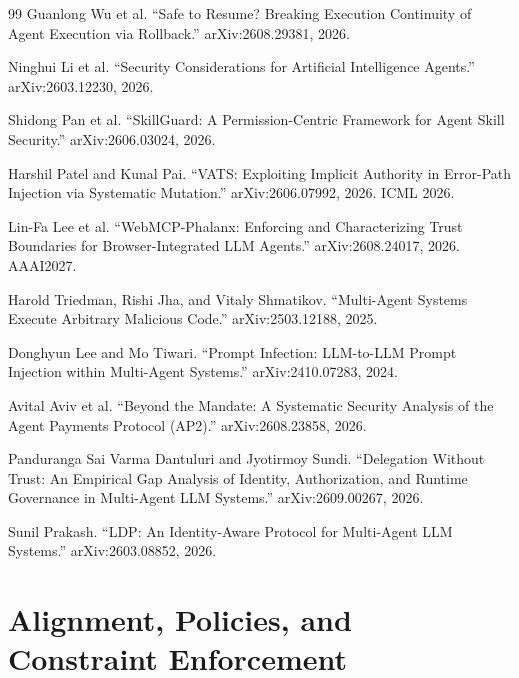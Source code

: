 \documentclass[11pt]{book}
\begin{document}
\begin{thebibliography}{99}
Guanlong Wu et al.
``Safe to Resume? Breaking Execution Continuity of Agent Execution via Rollback.''
arXiv:2608.29381, 2026.

Ninghui Li et al.
``Security Considerations for Artificial Intelligence Agents.''
arXiv:2603.12230, 2026.

Shidong Pan et al.
``SkillGuard: A Permission-Centric Framework for Agent Skill Security.''
arXiv:2606.03024, 2026.

Harshil Patel and Kunal Pai.
``VATS: Exploiting Implicit Authority in Error-Path Injection via Systematic Mutation.''
arXiv:2606.07992, 2026. ICML 2026.

Lin-Fa Lee et al.
``WebMCP-Phalanx: Enforcing and Characterizing Trust Boundaries for Browser-Integrated LLM Agents.''
arXiv:2608.24017, 2026. AAAI2027.

Harold Triedman, Rishi Jha, and Vitaly Shmatikov.
``Multi-Agent Systems Execute Arbitrary Malicious Code.''
arXiv:2503.12188, 2025.

Donghyun Lee and Mo Tiwari.
``Prompt Infection: LLM-to-LLM Prompt Injection within Multi-Agent Systems.''
arXiv:2410.07283, 2024.

Avital Aviv et al.
``Beyond the Mandate: A Systematic Security Analysis of the Agent Payments Protocol (AP2).''
arXiv:2608.23858, 2026.

Panduranga Sai Varma Dantuluri and Jyotirmoy Sundi.
``Delegation Without Trust: An Empirical Gap Analysis of Identity, Authorization, and Runtime Governance in Multi-Agent LLM Systems.''
arXiv:2609.00267, 2026.

Sunil Prakash.
``LDP: An Identity-Aware Protocol for Multi-Agent LLM Systems.''
arXiv:2603.08852, 2026.
\end{thebibliography}

\chapter{Alignment, Policies, and Constraint Enforcement}
\label{ch:alignment}
\end{document}
